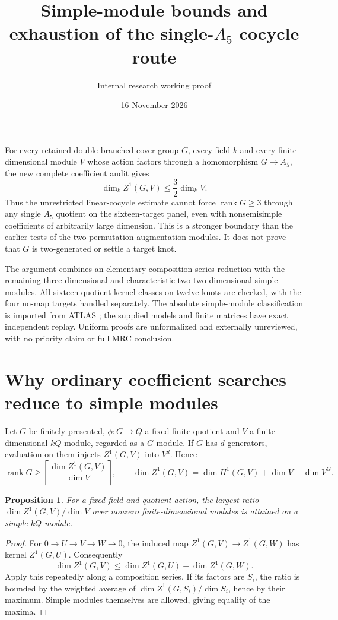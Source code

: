 \documentclass[11pt]{article}
\title{Simple-module bounds and exhaustion of the single-$A_5$ cocycle route}
\author{Internal research working proof}
\date{16 November 2026}
\newtheorem{proposition}[theorem]{Proposition}
\newcommand{\rank}{\operatorname{rank}}
\begin{document}
\maketitle

For every retained double-branched-cover group $G$, every field $k$
and every finite-dimensional module $V$ whose action factors through
a homomorphism $G\to A_5$, the new complete coefficient audit gives
\begin{equation}\label{eq:bound}
 \dim_k Z^1(G,V)\le\frac32\dim_k V.
\end{equation}
Thus the unrestricted linear-cocycle estimate cannot force
$\rank G\ge3$ through any single $A_5$ quotient on the sixteen-target
panel, even with nonsemisimple coefficients of arbitrarily large
dimension. This is a stronger boundary than the earlier tests of
the two permutation augmentation modules. It does not prove that
$G$ is two-generated or settle a target knot.

The argument combines an elementary composition-series reduction
with the remaining three-dimensional and characteristic-two
two-dimensional simple modules. All sixteen quotient-kernel classes
on twelve knots are checked, with the four no-map targets handled
separately. The absolute simple-module classification is imported
from ATLAS \cite{atlas}; the supplied models and finite matrices have
exact independent replay. Uniform proofs are unformalized and
externally unreviewed, with no priority claim or full MRC conclusion.

\section{Why ordinary coefficient searches reduce to simple modules}

Let $G$ be finitely presented, $\phi:G\to Q$ a fixed finite quotient
and $V$ a finite-dimensional $kQ$-module, regarded as a $G$-module.
If $G$ has $d$ generators, evaluation on them injects $Z^1(G,V)$
into $V^d$. Hence
\[
 \rank G\ge\left\lceil\frac{\dim Z^1(G,V)}{\dim V}\right\rceil,
 \qquad
 \dim Z^1(G,V)=\dim H^1(G,V)+\dim V-\dim V^G.
\]

\begin{proposition}\label{prop:simple}
For a fixed field and quotient action, the largest ratio
$\dim Z^1(G,V)/\dim V$ over nonzero finite-dimensional modules is
attained on a simple $kQ$-module.
\end{proposition}
\begin{proof}
For $0\to U\to V\to W\to0$, the induced map
$Z^1(G,V)\to Z^1(G,W)$ has kernel $Z^1(G,U)$. Consequently
\[
 \dim Z^1(G,V)\le\dim Z^1(G,U)+\dim Z^1(G,W).
\]
Apply this repeatedly along a composition series. If its factors
are $S_i$, the ratio is bounded by the weighted average of
$\dim Z^1(G,S_i)/\dim S_i$, hence by their maximum. Simple modules
themselves are allowed, giving equality of the maxima.
\end{proof}
\end{document}
